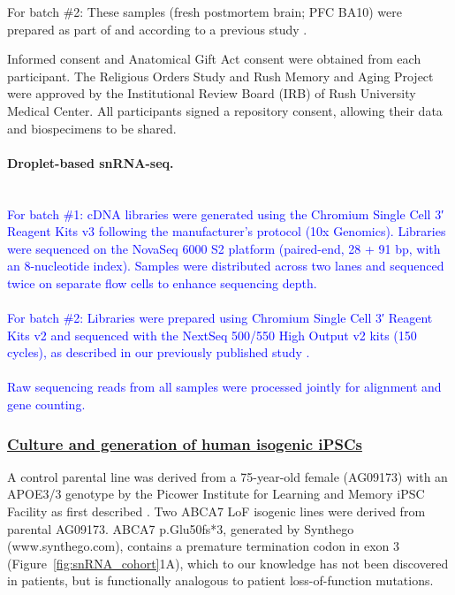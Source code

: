 \documentclass[12pt]{article}
\begin{document}
For batch \#2: These samples (fresh postmortem brain; PFC BA10) were prepared as part of and according to a previous study \cite{Mathys2019-wb}.

Informed consent and Anatomical Gift Act consent were obtained from each participant. The Religious Orders Study and Rush Memory and Aging Project were approved by the Institutional Review Board (IRB) of Rush University Medical Center. All participants signed a repository consent, allowing their data and biospecimens to be shared.

\paragraph{Droplet-based snRNA-seq.}\\ 
\newcommand{\quoteJ}{\textcolor{blue}{For batch \#1: cDNA libraries were generated using the Chromium Single Cell 3′ Reagent Kits v3 following the manufacturer's protocol (10x Genomics). Libraries were sequenced on the NovaSeq 6000 S2 platform (paired-end, 28 + 91 bp, with an 8-nucleotide index). Samples were distributed across two lanes and sequenced twice on separate flow cells to enhance sequencing depth.\label{quoteJ-label}}}
\quoteJ\\\\
\newcommand{\quoteK}{\textcolor{blue}{For batch \#2: Libraries were prepared using Chromium Single Cell 3′ Reagent Kits v2 and sequenced with the NextSeq 500/550 High Output v2 kits (150 cycles), as described in our previously published study \cite{Mathys2019-wb}.}}
\quoteK\\\\
\newcommand{\quoteZ}{\textcolor{blue}{Raw sequencing reads from all samples were processed jointly for alignment and gene counting.}}
\quoteZ\\





 \subsubsection{\underline{Culture and generation of human isogenic iPSCs}} 

A control parental line was derived from a 75-year-old female (AG09173) with an APOE3/3 genotype by the Picower Institute for Learning and Memory iPSC Facility as first described \cite{Lin2018-ma}. Two ABCA7 LoF isogenic lines were derived from parental AG09173. ABCA7 p.Glu50fs*3, generated by Synthego (www.synthego.com), contains a premature termination codon in exon 3 (Figure~\ref{fig:snRNA_cohort}1A), which to our knowledge has not been discovered in patients, but is functionally analogous to patient loss-of-function mutations.
\end{document}

